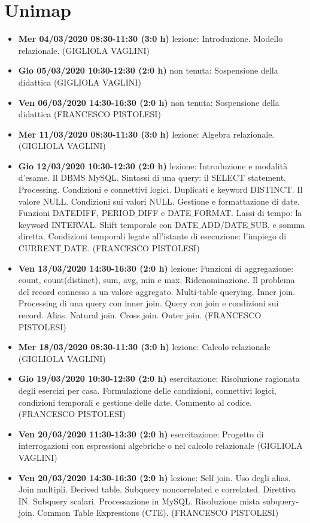 
\part{Unimap}
\small
\begin{itemize}
	\item \textbf{Mer 04/03/2020 08:30-11:30 (3:0 h)} lezione: Introduzione. Modello relazionale. (GIGLIOLA VAGLINI)
	\item \textbf{Gio 05/03/2020 10:30-12:30 (2:0 h)} non tenuta: Sospensione della didattica (GIGLIOLA VAGLINI)
	\item \textbf{Ven 06/03/2020 14:30-16:30 (2:0 h)} non tenuta: Sospensione della didattica (FRANCESCO PISTOLESI)
	\item \textbf{Mer 11/03/2020 08:30-11:30 (3:0 h)} lezione: Algebra relazionale. (GIGLIOLA VAGLINI)
	\item \textbf{Gio 12/03/2020 10:30-12:30 (2:0 h)} lezione: Introduzione e modalità d'esame. Il DBMS MySQL. Sintassi di una query: il SELECT statement. Processing. Condizioni e connettivi logici. Duplicati e keyword DISTINCT. Il valore NULL. Condizioni sui valori NULL. Gestione e formattazione di date. Funzioni DATEDIFF, PERIOD$\_$DIFF e DATE$\_$FORMAT. Lassi di tempo: la keyword INTERVAL. Shift temporale con DATE$\_$ADD/DATE$\_$SUB, e somma diretta. Condizioni temporali legate all'istante di esecuzione: l'impiego di CURRENT$\_$DATE. (FRANCESCO PISTOLESI)
	\item \textbf{Ven 13/03/2020 14:30-16:30 (2:0 h)} lezione: Funzioni di aggregazione: count, count(distinct), sum, avg, min e max. Ridenominazione. Il problema del record connesso a un valore aggregato. Multi-table querying. Inner join. Processing di una query con inner join. Query con join e condizioni sui record. Alias. Natural join. Cross join. Outer join. (FRANCESCO PISTOLESI)
	\item \textbf{Mer 18/03/2020 08:30-11:30 (3:0 h)} lezione: Calcolo relazionale (GIGLIOLA VAGLINI)
	\item \textbf{Gio 19/03/2020 10:30-12:30 (2:0 h)} esercitazione: Risoluzione ragionata degli esercizi per casa. Formulazione delle condizioni, connettivi logici, condizioni temporali e gestione delle date. Commento al codice. (FRANCESCO PISTOLESI)
	\item \textbf{Ven 20/03/2020 11:30-13:30 (2:0 h)} esercitazione: Progetto di interrogazioni con espressioni algebriche o nel calcolo relazionale (GIGLIOLA VAGLINI)
	\item \textbf{Ven 20/03/2020 14:30-16:30 (2:0 h)} lezione: Self join. Uso degli alias. Join multipli. Derived table. Subquery noncorrelated e correlated. Direttiva IN. Subquery scalari. Processazione in MySQL. Risoluzione mista subquery-join. Common Table Expressions (CTE). (FRANCESCO PISTOLESI)

\end{itemize}
